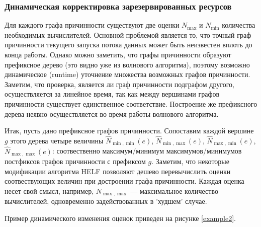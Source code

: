 \documentclass[10pt,a4paper]{article}
\begin{document}
 \subsubsection{Динамическая корректировка зарезервированных ресурсов}
   Для каждого графа причинности существуют две оценки $N_{\max}$ и $N_{\min}$ количества необходимых вычислителей.
   Основной проблемой является то, что точный граф причинности текущего запуска потока данных может быть неизвестен вплоть до конца работы.
   Однако можно заметить, что графы причинности образуют префиксное дерево (это видно уже из волнового алгоритма), поэтому возможно
   динамическое (runtime) уточнение множества возможных графов причинности. Заметим, что проверка, является ли граф причинности подграфом другого, осуществляется
   за линейное время, так как между вершинами графов причинности существует единственное соответствие. Построение же префиксного дерева неявно осуществляется во время работы
   волнового алгоритма.
   
   Итак, пусть дано префиксное графов причинности. Сопоставим каждой вершине $g$ этого дерева четыре величины $\hat{N}_{\min, \min}(e)$, $\hat{N}_{\min, \max}(e)$,
   $\hat{N}_{\max, \min}(e)$, $\hat{N}_{\max, \max}(e)$: соотвественно максимум/минимум максимумов/минимумов постфиксов графов причинности с префиксом $g$.
   Заметим, что некоторые модификации алгоритма HELF позволяют дешево перевычислить оценки соотвествующих величин при достроении графа причинности.
   Каждая оценка несет свой смысл, например, $N_{\max, \max}$ --- максимальное количество вычислителей, одновременно задействованных в 'худшем' случае.
   
   Пример динамического изменения оценок приведен на рисунке \ref{example2}.
   
\end{document}
